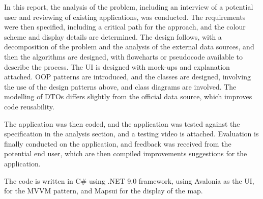 In this report, the analysis of the problem, including an interview of a potential user and reviewing of existing applications, was conducted. The requirements were then specified, including a critical path for the approach, and the colour scheme and display details are determined. The design follows, with a decomposition of the problem and the analysis of the external data sources, and then the algorithms are designed, with flowcharts or pseudocode available to describe the process. The UI is designed with mock-ups and explanation attached. OOP patterns are introduced, and the classes are designed, involving the use of the design patterns above, and class diagrams are involved. The modelling of DTOs differs slightly from the official data source, which improves code reusability.

The application was then coded, and the application was tested against the specification in the analysis section, and a testing video is attached. Evaluation is finally conducted on the application, and feedback was received from the potential end user, which are then compiled improvements suggestions for the application.

The code is written in C\# using .NET 9.0 framework, using Avalonia as the UI,  for the MVVM pattern, and Mapsui for the display of the map.